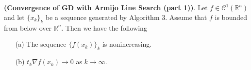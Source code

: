 \documentclass{ExerciseSheet}
\newif\ifsolutions
\begin{document}
\vskip 0.5cm
\begin{problem}
    \textbf{(Convergence of GD with Armijo Line Search (part 1))}. 
Let $ f \in \mathcal{C}^1(\mathbb{R}^n) $ and let $ \{x_k\}_k $ be a sequence generated by Algorithm 3. 
Assume that $f $ is bounded from below over $\mathbb{R}^n $. Then we have the following

\begin{itemize}
    \item[(a)] The sequence $ \{f(x_k)\}_k $ is nonincreasing.
    \item[(b)] $t_k \nabla f(x_k) \to 0 $ as $k \to \infty $.
\end{itemize}
\end{problem}
\ifsolutions
\vskip 0.3cm
\end{document}
